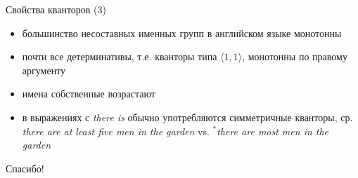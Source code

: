 \documentclass{beamer}
\begin{document}
\begin{frame}{Свойства кванторов (3)}
\begin{itemize}
   	\item большинство несоставных именных групп в английском языке монотонны
   	\item почти все детерминативы, т.е. кванторы типа $\langle 1, 1 \rangle$, монотонны по правому аргументу
   	\item имена собственные возрастают
   	\item в выражениях с \textit{there is} обычно употребляются симметричные кванторы, ср. \textit{there are at least five men in the garden} vs. \textit{$^*$there are most men in the garden} 
\end{itemize}
\end{frame}





\begin{frame}{}
    \thispagestyle{empty}
    \begin{center}
        {\large Спасибо!}
    \end{center}
\end{frame}
\end{document}
